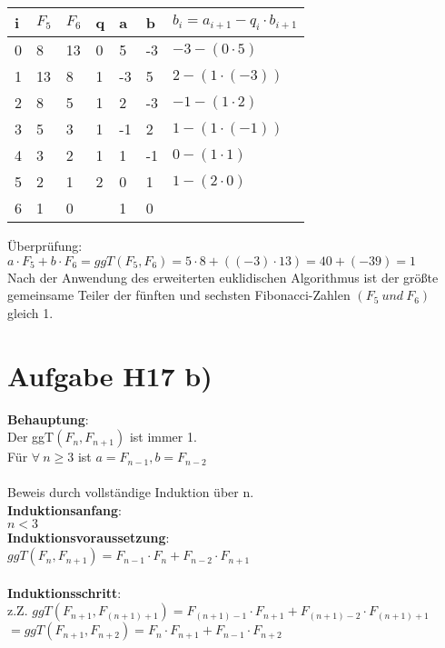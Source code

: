 \documentclass[11pt,a4paper]{article}
\begin{document}
\begin{center}
	\begin{tabular}{ | l | l | l | l | l | l | l|}
		\hline
		i&$F_5$&$F_6$&q&a&b&$b_i=a_{i+1}-q_i \cdot b_{i+1} $ \\ \hline	\hline	
		0&8&13&0&5&-3&$-3-(0 \cdot 5 )$ \\ \hline
		1&13&8&1&-3&5&$2-(1 \cdot (-3) )$ \\ \hline
		2&8&5&1&2&-3&$-1-(1 \cdot 2)$\\ \hline
		3&5&3&1&-1&2&$1-(1 \cdot (-1))$ \\ \hline
		4&3&2&1&1&-1&$0-(1 \cdot 1)$ \\ \hline
		5&2&1&2&0&1&$1-(2\cdot 0)$ \\ \hline
		6&1&0&&1&0&\\ \hline
	\end{tabular}
\end{center}

Überprüfung:\\
$a\cdot F_5 +b \cdot F_6 = ggT(F_5,F_6) = 5 \cdot 8 + ((-3)\cdot 13) = 40+(-39)=1$\\
Nach der Anwendung des erweiterten euklidischen Algorithmus ist der größte gemeinsame Teiler der fünften und sechsten Fibonacci-Zahlen $(F_5~und~F_6)$ gleich 1.\\

\section*{Aufgabe H17 b)}
\textbf{Behauptung}: \\
Der ggT$(F_n, F_{n+1})$ ist immer 1.\\
Für $\forall~n \geq 3$ ist $a=F_{n-1} , b= F_{n-2}$\\
\\
Beweis durch vollständige Induktion über n.\\
\textbf{Induktionsanfang}:\\
$n<3$
\\
\textbf{Induktionsvoraussetzung}:\\
$ggT(F_n, F_{n+1}) = F_{n-1} \cdot F_n+F_{n-2}\cdot F_{n+1}$\\
\\
\textbf{Induktionsschritt}:\\
z.Z.
$ggT(F_{n+1}, F_{(n+1)+1})=F_{(n+1)-1} \cdot F_{n+1} + F_{(n+1)-2} \cdot F_{(n+1)+1}$\\
$=ggT(F_{n+1}, F_{n+2})=F_{n} \cdot F_{n+1} + F_{n-1} \cdot F_{n+2}$
\end{document}
